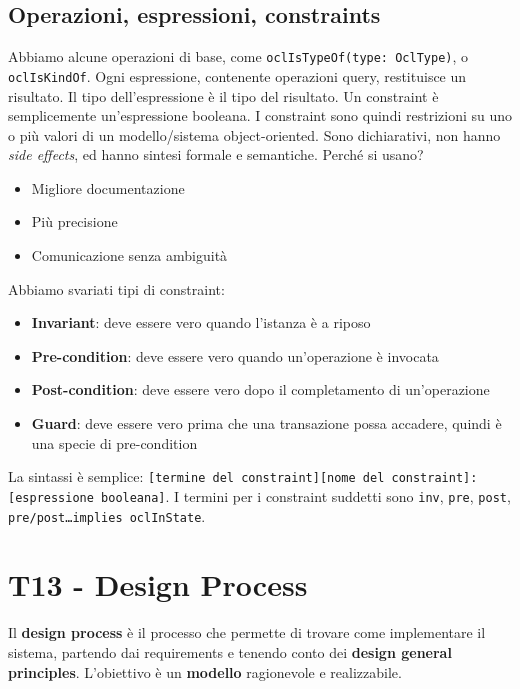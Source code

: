 \documentclass[11pt]{article}
\newcommand{\code}[1]{\texttt{#1}}
\begin{document}
\subsection{Operazioni, espressioni, constraints}
Abbiamo alcune operazioni di base, come \code{oclIsTypeOf(type: OclType)}, o \code{oclIsKindOf}. Ogni espressione, contenente operazioni query, restituisce un risultato. Il tipo dell'espressione è il tipo del risultato. Un constraint è semplicemente un'espressione booleana. 
I constraint sono quindi restrizioni su uno o più valori di un modello/sistema object-oriented. Sono dichiarativi, non hanno \textit{side effects}, ed hanno sintesi formale e semantiche. Perché si usano?
\begin{itemize}
    \item Migliore documentazione
    \item Più precisione
    \item Comunicazione senza ambiguità
\end{itemize}
Abbiamo svariati tipi di constraint:
\begin{itemize}
    \item \textbf{Invariant}: deve essere vero quando l'istanza è a riposo
    \item \textbf{Pre-condition}: deve essere vero quando un'operazione è invocata
    \item \textbf{Post-condition}: deve essere vero dopo il completamento di un'operazione
    \item \textbf{Guard}: deve essere vero prima che una transazione possa accadere, quindi è una specie di pre-condition
\end{itemize}
La sintassi è semplice: \code{[termine del constraint][nome del constraint]:[espressione booleana]}. I termini per i constraint suddetti sono \code{inv}, \code{pre}, \code{post}, \code{pre/post…implies oclInState}.
\section{T13 - Design Process}
Il \textbf{design process} è il processo che permette di trovare come implementare il sistema, partendo dai requirements e tenendo conto dei \textbf{design general principles}. L'obiettivo è un \textbf{modello} ragionevole e realizzabile. 
\end{document}
